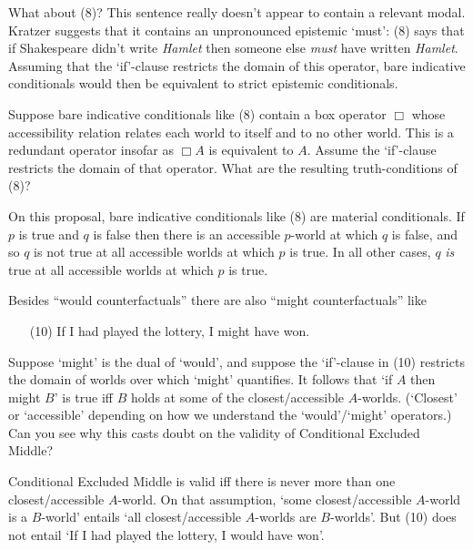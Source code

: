 What about (8)? This sentence really doesn't appear to contain a relevant modal.
Kratzer suggests that it contains an unpronounced epistemic `must': (8) says
that if Shakespeare didn't write \emph{Hamlet} then someone else \emph{must}
have written \emph{Hamlet}. Assuming that the `if'-clause restricts the domain
of this operator, bare indicative conditionals would then be equivalent to
strict epistemic conditionals.

\begin{exercise}
  Suppose bare indicative conditionals like (8) contain a box operator $\Box$
  whose accessibility relation relates each world to itself and to no other
  world. This is a redundant operator insofar as $\Box A$ is equivalent to $A$.
  Assume the `if'-clause restricts the domain of that operator. What are the
  resulting truth-conditions of (8)?
\end{exercise}
\begin{solution}
  On this proposal, bare indicative conditionals like (8) are material
  conditionals. If $p$ is true and $q$ is false then there is an accessible
  $p$-world at which $q$ is false, and so $q$ is not true at all accessible
  worlds at which $p$ is true. In all other cases, $q$ \emph{is} true at all
  accessible worlds at which $p$ is true.
\end{solution}

\begin{exercise}
  Besides ``would counterfactuals'' there are also ``might counterfactuals'' like
  \begin{enumerate}[leftmargin=10mm]
    \item[(10)] If I had played the lottery, I might have won.
  \end{enumerate}
  Suppose `might' is the dual of `would', and suppose the `if'-clause in (10)
  restricts the domain of worlds over which `might' quantifies. It follows that
  `if $A$ then might $B$' is true iff $B$ holds at some of the
  closest/accessible $A$-worlds. (`Closest' or `accessible' depending on how we
  understand the `would'/`might' operators.) Can you see why this casts doubt on
  the validity of Conditional Excluded Middle?
\end{exercise}
\begin{solution}
  Conditional Excluded Middle is valid iff there is never more than one
  closest/accessible $A$-world. On that assumption, `some closest/accessible
  $A$-world is a $B$-world' entails `all closest/accessible $A$-worlds are
  $B$-worlds'. But (10) does not entail `If I had played the lottery, I would
  have won'.
\end{solution}


